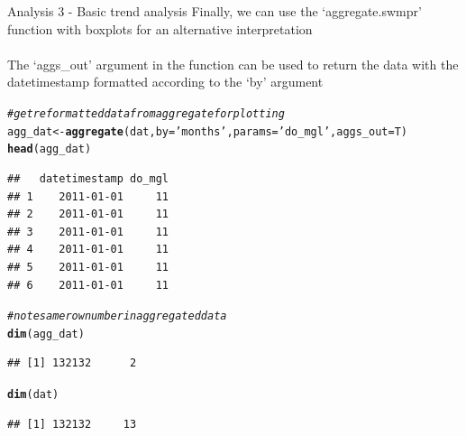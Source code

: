 \documentclass[xcolor=svgnames]{beamer}\usepackage[]{graphicx}\usepackage[]{color}
\makeatletter
\newcommand{\hlstr}[1]{\textcolor[rgb]{0.192,0.494,0.8}{#1}}%
\newcommand{\hlcom}[1]{\textcolor[rgb]{0.678,0.584,0.686}{\textit{#1}}}%
\newcommand{\hlstd}[1]{\textcolor[rgb]{0.345,0.345,0.345}{#1}}%
\newcommand{\hlkwb}[1]{\textcolor[rgb]{0.69,0.353,0.396}{#1}}%
\newcommand{\hlkwc}[1]{\textcolor[rgb]{0.333,0.667,0.333}{#1}}%
\newcommand{\hlkwd}[1]{\textcolor[rgb]{0.737,0.353,0.396}{\textbf{#1}}}%
\newenvironment{kframe}{%
 \def\at@end@of@kframe{}%
 \ifinner\ifhmode%
  \def\at@end@of@kframe{\end{minipage}}%
  \begin{minipage}{\columnwidth}%
 \fi\fi%
 \def\FrameCommand##1{\hskip\@totalleftmargin \hskip-\fboxsep
 \colorbox{shadecolor}{##1}\hskip-\fboxsep
     \hskip-\linewidth \hskip-\@totalleftmargin \hskip\columnwidth}%
 \MakeFramed {\advance\hsize-\width
   \@totalleftmargin\z@ \linewidth\hsize
   \@setminipage}}%
 {\par\unskip\endMakeFramed%
 \at@end@of@kframe}
\newenvironment{knitrout}{}{} %
\makeatother
\begin{document}
\begin{frame}[containsverbatim]{Analysis 3 - Basic trend analysis}
Finally, we can use the `aggregate.swmpr' function with boxplots for an alternative interpretation \\~\\
The `aggs_out' argument in the function can be used to return the data with the datetimestamp formatted according to the `by' argument
\begin{knitrout}\scriptsize
{}\color{fgcolor}\begin{kframe}
\begin{alltt}
\hlcom{# get reformatted data from aggregate for plotting}
\hlstd{agg_dat} \hlkwb{<-} \hlkwd{aggregate}\hlstd{(dat,} \hlkwc{by} \hlstd{=} \hlstr{'months'}\hlstd{,} \hlkwc{params} \hlstd{=} \hlstr{'do_mgl'}\hlstd{,} \hlkwc{aggs_out} \hlstd{= T)}
\hlkwd{head}\hlstd{(agg_dat)}
\end{alltt}
\begin{verbatim}
##   datetimestamp do_mgl
## 1    2011-01-01     11
## 2    2011-01-01     11
## 3    2011-01-01     11
## 4    2011-01-01     11
## 5    2011-01-01     11
## 6    2011-01-01     11
\end{verbatim}
\begin{alltt}
\hlcom{# note same row number in aggregated data}
\hlkwd{dim}\hlstd{(agg_dat)}
\end{alltt}
\begin{verbatim}
## [1] 132132      2
\end{verbatim}
\begin{alltt}
\hlkwd{dim}\hlstd{(dat)}
\end{alltt}
\begin{verbatim}
## [1] 132132     13
\end{verbatim}
\end{kframe}
\end{knitrout}
\end{frame}
\end{document}
